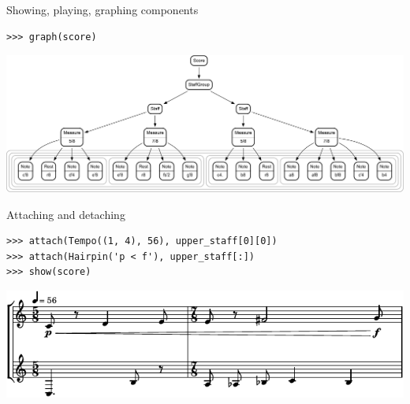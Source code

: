 \begin{frame}[fragile]{Showing, playing, graphing components}

\begin{abjadbookoutput}
\begin{singlespacing}
\vspace{-0.5\baselineskip}
\begin{verbatim}
>>> graph(score)
\end{verbatim}
\noindent\includegraphics[scale=0.4,max width=\textwidth,]{assets/graphviz-f61d9a8396054b4e530a8a03fd770801.pdf}
\end{singlespacing}
\end{abjadbookoutput}

\end{frame}

\begin{frame}[fragile]{Attaching and detaching}

\begin{abjadbookoutput}
\begin{singlespacing}
\vspace{-0.5\baselineskip}
\begin{verbatim}
>>> attach(Tempo((1, 4), 56), upper_staff[0][0])
>>> attach(Hairpin('p < f'), upper_staff[:])
>>> show(score)
\end{verbatim}
\noindent\includegraphics[max width=\textwidth,]{assets/lilypond-a9e19ad38171a32a9492dd585d335ca4.pdf}
\end{singlespacing}
\end{abjadbookoutput}

\end{frame}

